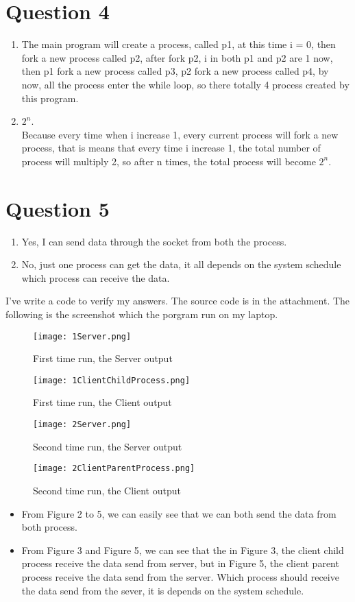 \documentclass[a4paper,12pt]{article}
\begin{document}
\section*{Question 4}
\begin{enumerate}
\item The main program will create a process, called p1, at this time i = 0, then fork a new process called p2, after fork p2, i in both p1 and p2 are 1 now, then p1 fork a new process called p3, p2 fork a new process called p4, by now, all the process enter the while loop, so there totally 4 process created by this program.
\item $2^n$.\\ Because every time when i increase 1, every current process will fork a new process, that is means that every time i increase 1, the total number of process will multiply 2, so after n times, the total process will become $2^n$.
\end{enumerate}
\section*{Question 5}
\begin{enumerate}
\item Yes, I can send data through the socket from both the process.
\item No, just one process can get the data, it all depends on the system schedule which process can receive the data.
\end{enumerate}
I've write a code to verify my answers.
The source code is in the attachment.
The following is the screenshot which the porgram run on my laptop.
\newpage
\begin{figure}[!htbp]
\texttt{[image: 1Server.png]}
\caption{First time run, the Server output}
\end{figure} 
\begin{figure}[!htbp]
\texttt{[image: 1ClientChildProcess.png]}
\caption{First time run, the Client output}
\end{figure} 
\begin{figure}[!htbp]
\texttt{[image: 2Server.png]}
\caption{Second time run, the Server output}
\end{figure} 
\begin{figure}[!htbp]
\texttt{[image: 2ClientParentProcess.png]}
\caption{Second time run, the Client output}
\end{figure} 
\begin{itemize}
\item From Figure 2 to 5, we can easily see that we can both send the data from both process.\\
\item From Figure 3 and Figure 5, we can see that the in Figure 3, the client child process receive the data send from server, but in Figure 5, the client parent process receive the data send from the server. Which process should receive the data send from the sever, it is depends on the system schedule.
\end{itemize}
\end{document}
